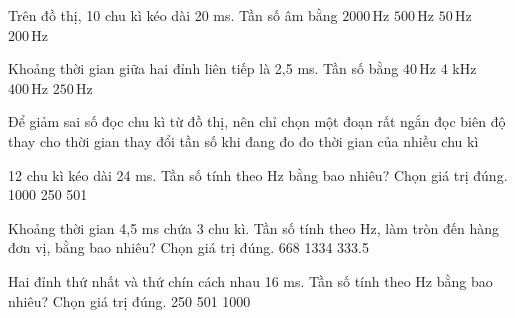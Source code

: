 \begin{ex}
Trên đồ thị, 10 chu kì kéo dài 20 ms. Tần số âm bằng
\choice
{$2000\,\text{Hz}$}
{\True $500\,\text{Hz}$}
{$50\,\text{Hz}$}
{$200\,\text{Hz}$}
\end{ex}

\begin{ex}
Khoảng thời gian giữa hai đỉnh liên tiếp là 2,5 ms. Tần số bằng
\choice
{$40\,\text{Hz}$}
{4 kHz}
{\True $400\,\text{Hz}$}
{$250\,\text{Hz}$}
\end{ex}

\begin{ex}
Để giảm sai số đọc chu kì từ đồ thị, nên
\choice
{chỉ chọn một đoạn rất ngắn}
{đọc biên độ thay cho thời gian}
{thay đổi tần số khi đang đo}
{\True đo thời gian của nhiều chu kì}
\end{ex}

\begin{ex}
12 chu kì kéo dài 24 ms. Tần số tính theo Hz bằng bao nhiêu? Chọn giá trị đúng.
\choice
{}
{1000}
{250}
{501}
\end{ex}

\begin{ex}
Khoảng thời gian 4,5 ms chứa 3 chu kì. Tần số tính theo Hz, làm tròn đến hàng đơn vị, bằng bao nhiêu? Chọn giá trị đúng.
\choice
{668}
{}
{1334}
{333.5}
\end{ex}

\begin{ex}
Hai đỉnh thứ nhất và thứ chín cách nhau 16 ms. Tần số tính theo Hz bằng bao nhiêu? Chọn giá trị đúng.
\choice
{250}
{501}
{}
{1000}
\end{ex}

